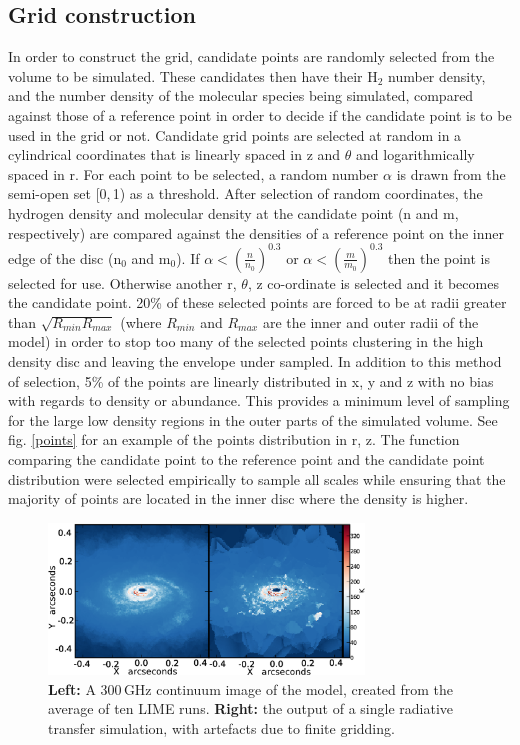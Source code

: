 \documentclass[useAMS,usenatbib]{mn2e}
\begin{document}
\subsection{Grid construction} \label{subsec:gridding}
In order to construct the grid, candidate points are randomly selected from the volume to be simulated. These candidates then have their H$_2$ number density, and the number density of the molecular species being simulated, compared against those of a reference point in order to decide if the candidate point is to be used in the grid or not. Candidate grid points are selected at random in a cylindrical coordinates that is linearly spaced in z and $\theta$ and logarithmically spaced in r. For each point to be selected, a random number $\alpha$ is drawn from the semi-open set [0,$\,$1) as a threshold. After selection of random coordinates, the hydrogen density and molecular density at the candidate point (n and m, respectively) are compared against the densities of a reference point on the inner edge of the disc (n$_0$ and m$_0$). If $\alpha<\left( \frac{n}{n_0} \right)^{0.3}$ or $\alpha< \left( \frac{m}{m_0} \right)^{0.3}$ then the point is selected for use. Otherwise another r, $\theta$, z co-ordinate is selected and it becomes the candidate point. 20\% of these selected points are forced to be at radii greater than $\sqrt{R_{min}R_{max}}$ (where $R_{min}$ and $R_{max}$ are the inner and outer radii of the model) in order to stop too many of the selected points clustering in the high density disc and leaving the envelope under sampled. In addition to this method of selection, 5\% of the points are linearly distributed in x, y and z with no bias with regards to density or abundance. This provides a minimum level of sampling for the large low density regions in the outer parts of the simulated volume. See fig. \ref{points} for an example of the points distribution in r, z. The function comparing the candidate point to the reference point and the candidate point distribution were selected empirically to sample all scales while ensuring that the majority of points are located in the inner disc where the density is higher.  \smallskip

\begin{figure}
 \includegraphics[width=84mm]{Figures/sim/fig06.eps}
 \caption{{\bf Left:} A 300$\,$GHz continuum image of the model, created from the average of ten LIME runs. {\bf Right:} the output of a single radiative transfer simulation, with artefacts due to finite gridding.}
 \label{averages}
\end{figure}
\end{document}
